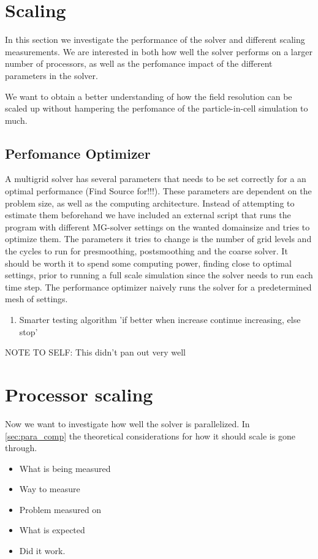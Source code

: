 \section{Scaling}
  In this section we investigate the performance of the solver and different scaling
  measurements. We are interested in both how well the solver performs on a larger
  number of processors, as well as the perfomance impact of the different
  parameters in the solver.

  We want to obtain a better understanding of how the field resolution can be scaled
  up without hampering the perfomance of the particle-in-cell simulation to much.

  \subsection{Perfomance Optimizer}
    A multigrid solver has several parameters that needs to be set correctly for
    a an optimal performance (Find Source for!!!). These parameters are dependent on the problem size,
    as well as the computing architecture. Instead of attempting to estimate them beforehand
    we have included an external script that runs the program with different MG-solver
    settings on the wanted domainsize and tries to optimize them.
    The parameters it tries to change is the number of grid levels and the cycles
    to run for presmoothing, postsmoothing and the coarse solver. It should be worth it
    to spend some computing power, finding close to optimal settings,  prior to
    running a full scale simulation since the solver needs to run each time step.
    The performance optimizer naively runs the solver for a predetermined mesh of
    settings.

    \begin{enumerate}
      \item Smarter testing algorithm 'if better when increase continue increasing, else stop'
    \end{enumerate}

	NOTE TO SELF: This didn't pan out very well

	\section{Processor scaling}
		Now we want to investigate how well the solver is parallelized. In \cref{sec:para_comp}
		the theoretical considerations for how it should scale is gone through.

	\begin{itemize}
		\item What is being measured
		\item Way to measure
		\item Problem measured on
		\item What is expected
		\item Did it work.
	\end{itemize}
